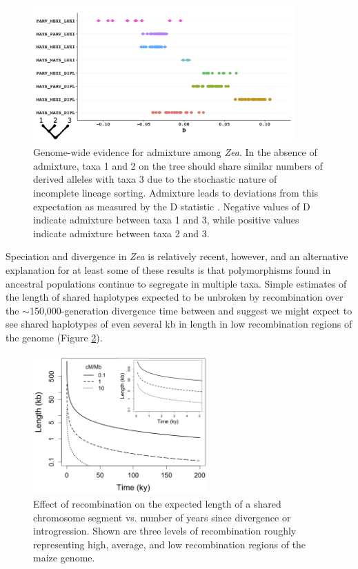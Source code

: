 \begin{figure}
  \centering
   \includegraphics[width=0.9\textwidth]{abbas}
    \caption{Genome-wide evidence for admixture among \emph{Zea}. In the absence of admixture, taxa 1 and 2 on the tree should share similar numbers of derived alleles with taxa 3 due to the stochastic nature of incomplete lineage sorting.  Admixture leads to deviations from this expectation as measured by the D statistic \citep{green2010draft}. Negative values of D indicate admixture between taxa 1 and 3, while positive values indicate admixture between taxa 2 and 3.} 
\label{fig:abba}
\end{figure}

Speciation and divergence in \emph{Zea} is relatively recent, however, and an alternative explanation for at least some of these results is that polymorphisms found in ancestral populations continue to segregate in multiple taxa. 		
Simple estimates of the length of shared haplotypes expected to be unbroken by recombination over the $\sim$150,000-generation divergence time between \zm{} and \zl{} \citep{Ross-Ibarra2009a} suggest we might expect to see shared haplotypes of even several kb in length in low recombination regions of the genome (Figure \ref{fig:length}).

\begin{figure}
  \centering
   \includegraphics[width=0.6\textwidth]{length_vs_time2}
    \caption{Effect of recombination on the expected length of a shared chromosome segment vs. number of years since divergence or introgression.  Shown are three levels of recombination roughly representing high, average, and low recombination regions of the maize genome.}
\label{fig:length}
\end{figure}

